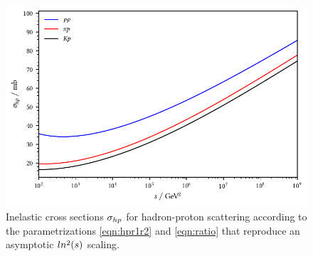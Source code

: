\begin{figure}[H]
	\centering
	\includegraphics{../plots/build/hadron_proton_scattering.pdf}
	\caption[Inelastic cross sections $\sigma_{h \kern-0.1pt p}$ for hadron-proton scattering.]{Inelastic cross sections
			 $\sigma_{h \kern-0.1pt p}$ for hadron-proton scattering according to the parametrizations \eqref{eqn:hpr1r2}
			 and \eqref{eqn:ratio} that reproduce an asymptotic $\cramped{ln^2(s)}$ scaling.}
	\label{fig:hadron-proton-scattering}
\end{figure}
